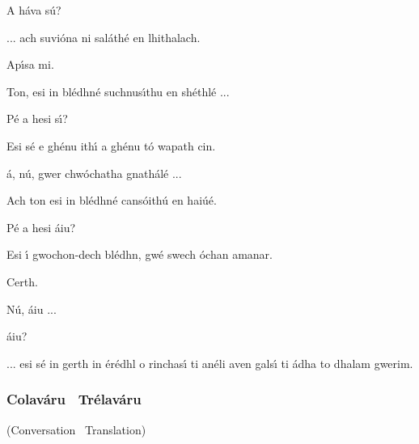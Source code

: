 \begin{leftbubbles}A h\'{a}va s\'{u}?\end{leftbubbles}
\begin{rightbubbles}... ach suvi\'{o}na ni sal\'{a}th\'{e} en lhithalach.\end{rightbubbles}
\begin{leftbubbles}Ap\'{\i}sa mi.\end{leftbubbles}
\begin{rightbubbles}Ton, esi in bl\'{e}dhn\'{e} suchnus\'{\i}thu en sh\'{e}thl\'{e} ...\end{rightbubbles}
\begin{leftbubbles}P\'{e} a hesi s\'{\i}?\end{leftbubbles}
\begin{rightbubbles}Esi s\'{e} e gh\'{e}nu ith\'{\i} a gh\'{e}nu t\'{o} wapath cin.\end{rightbubbles}
\begin{leftbubbles}\'{a}, n\'{u}, gwer chw\'{o}chatha gnath\'{a}l\'{e} ...\end{leftbubbles}
\begin{rightbubbles}Ach ton esi in bl\'{e}dhn\'{e} cans\'{o}ith\'{u} en hai\'{u}\'{e}.\end{rightbubbles}
\begin{leftbubbles}P\'{e} a hesi \'{a}iu?\end{leftbubbles}
\begin{rightbubbles}Esi \'{\i} gwochon-dech bl\'{e}dhn, gw\'{e} swech \'{o}chan amanar.\end{rightbubbles}
\begin{leftbubbles}Certh.\end{leftbubbles}
\begin{rightbubbles}N\'{u}, \'{a}iu ...\end{rightbubbles}
\begin{leftbubbles}\'{a}iu?\end{leftbubbles}
\begin{rightbubbles}... esi s\'{e} in gerth in \'{e}r\'{e}dhl o rinchas\'{\i} ti an\'{e}li aven gals\'{\i} ti \'{a}dha to dhalam gwerim.\end{rightbubbles}
\endgroup

\newpage
\subsubsection{Colav\'{a}ru \textendash\ Tr\'{e}lav\'{a}ru}
(Conversation \textendash\ Translation)

